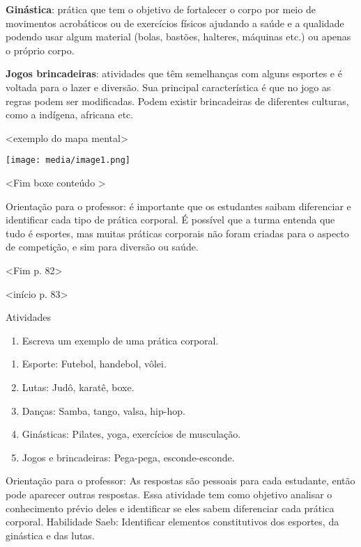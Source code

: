 \textbf{Ginástica}: prática que tem o objetivo de fortalecer o corpo por
meio de movimentos acrobáticos ou de exercícios físicos ajudando a saúde
e a qualidade podendo usar algum material (bolas, bastões, halteres,
máquinas etc.) ou apenas o próprio corpo.

\textbf{Jogos brincadeiras}: atividades que têm semelhanças com alguns
esportes e é voltada para o lazer e diversão. Sua principal
característica é que no jogo as regras podem ser modificadas. Podem
existir brincadeiras de diferentes culturas, como a indígena, africana
etc.

\textless{}exemplo do mapa mental\textgreater{}

\texttt{[image: media/image1.png]}

\textless{}Fim boxe conteúdo \textgreater{}

Orientação para o professor: é importante que os estudantes saibam
diferenciar e identificar cada tipo de prática corporal. É possível que
a turma entenda que tudo é esportes, mas muitas práticas corporais não
foram criadas para o aspecto de competição, e sim para diversão ou
saúde.

\textless{}Fim p. 82\textgreater{}

\textless{}início p. 83\textgreater{}

Atividades

\begin{enumerate}
\def\labelenumi{\arabic{enumi}.}
\item
  Escreva um exemplo de uma prática corporal.
\end{enumerate}

\begin{enumerate}
\def\labelenumi{\alph{enumi})}
\item
  Esporte: Futebol, handebol, vôlei.
\item
  Lutas: Judô, karatê, boxe.
\item
  Danças: Samba, tango, valsa, hip-hop.
\item
  Ginásticas: Pilates, yoga, exercícios de musculação.
\item
  Jogos e brincadeiras: Pega-pega, esconde-esconde.
\end{enumerate}

Orientação para o professor: As respostas são pessoais para cada
estudante, então pode aparecer outras respostas. Essa atividade tem como
objetivo analisar o conhecimento prévio deles e identificar se eles
sabem diferenciar cada prática corporal. Habilidade Saeb: Identificar
elementos constitutivos dos esportes, da ginástica e das lutas.

